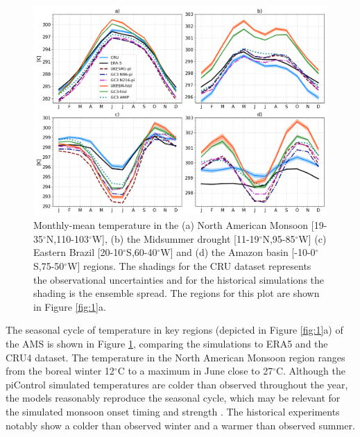 
\begin{figure}[t!]
\centering
 \includegraphics[width=\linewidth]{figures/p2fig2_v3.png}
\caption{ Monthly-mean temperature in the (a) North American Monsoon [19-35$^\circ$N,110-103$^\circ$W], (b) the Midsummer drought [11-19$^\circ$N,95-85$^\circ$W] (c) Eastern Brazil [20-10$^\circ$S,60-40$^\circ$W] and (d) the Amazon basin [-10-0$^\circ$S,75-50$^\circ$W] regions. The shadings for the CRU dataset represents the observational uncertainties and for the historical simulations the shading is the ensemble spread. The regions for this plot are shown in Figure \ref{fig:1}a. }
\label{fig:2}
\end{figure}

The seasonal cycle of temperature in key regions (depicted in Figure \ref{fig:1}a) of the AMS is shown in Figure \ref{fig:2}, comparing the simulations to ERA5 and the CRU4 dataset.
The temperature in the North American Monsoon region ranges from the boreal winter 12$^\circ$C to a maximum in June close to 27$^\circ$C.
Although the piControl simulated temperatures are colder than observed throughout the year, the models reasonably reproduce the seasonal cycle, which may be relevant for the simulated monsoon onset timing and strength \citep{turrent2009}. The historical experiments notably show a colder than observed winter and a warmer than observed summer.

